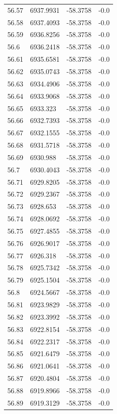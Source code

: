 \begin{table}[H]
\begin{tabular}{llll}
56.57 & 6937.9931 & -58.3758 & -0.0 \\
56.58 & 6937.4093 & -58.3758 & -0.0 \\
56.59 & 6936.8256 & -58.3758 & -0.0 \\
56.6 & 6936.2418 & -58.3758 & -0.0 \\
56.61 & 6935.6581 & -58.3758 & -0.0 \\
56.62 & 6935.0743 & -58.3758 & -0.0 \\
56.63 & 6934.4906 & -58.3758 & -0.0 \\
56.64 & 6933.9068 & -58.3758 & -0.0 \\
56.65 & 6933.323 & -58.3758 & -0.0 \\
56.66 & 6932.7393 & -58.3758 & -0.0 \\
56.67 & 6932.1555 & -58.3758 & -0.0 \\
56.68 & 6931.5718 & -58.3758 & -0.0 \\
56.69 & 6930.988 & -58.3758 & -0.0 \\
56.7 & 6930.4043 & -58.3758 & -0.0 \\
56.71 & 6929.8205 & -58.3758 & -0.0 \\
56.72 & 6929.2367 & -58.3758 & -0.0 \\
56.73 & 6928.653 & -58.3758 & -0.0 \\
56.74 & 6928.0692 & -58.3758 & -0.0 \\
56.75 & 6927.4855 & -58.3758 & -0.0 \\
56.76 & 6926.9017 & -58.3758 & -0.0 \\
56.77 & 6926.318 & -58.3758 & -0.0 \\
56.78 & 6925.7342 & -58.3758 & -0.0 \\
56.79 & 6925.1504 & -58.3758 & -0.0 \\
56.8 & 6924.5667 & -58.3758 & -0.0 \\
56.81 & 6923.9829 & -58.3758 & -0.0 \\
56.82 & 6923.3992 & -58.3758 & -0.0 \\
56.83 & 6922.8154 & -58.3758 & -0.0 \\
56.84 & 6922.2317 & -58.3758 & -0.0 \\
56.85 & 6921.6479 & -58.3758 & -0.0 \\
56.86 & 6921.0641 & -58.3758 & -0.0 \\
56.87 & 6920.4804 & -58.3758 & -0.0 \\
56.88 & 6919.8966 & -58.3758 & -0.0 \\
56.89 & 6919.3129 & -58.3758 & -0.0 \\

\end{tabular}
\end{table}
